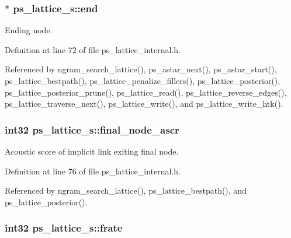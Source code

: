 \subsubsection[{end}]{$\ast$ ps\-\_\-lattice\-\_\-s\-::end}\label{structps__lattice__s_a00f30e2689853d6bcb31c8005a69dc7b}


Ending node. 



Definition at line 72 of file ps\-\_\-lattice\-\_\-internal.\-h.



Referenced by ngram\-\_\-search\-\_\-lattice(), ps\-\_\-astar\-\_\-next(), ps\-\_\-astar\-\_\-start(), ps\-\_\-lattice\-\_\-bestpath(), ps\-\_\-lattice\-\_\-penalize\-\_\-fillers(), ps\-\_\-lattice\-\_\-posterior(), ps\-\_\-lattice\-\_\-posterior\-\_\-prune(), ps\-\_\-lattice\-\_\-read(), ps\-\_\-lattice\-\_\-reverse\-\_\-edges(), ps\-\_\-lattice\-\_\-traverse\-\_\-next(), ps\-\_\-lattice\-\_\-write(), and ps\-\_\-lattice\-\_\-write\-\_\-htk().

\subsubsection[{final\-\_\-node\-\_\-ascr}]{\setlength{\rightskip}{0pt plus 5cm}int32 ps\-\_\-lattice\-\_\-s\-::final\-\_\-node\-\_\-ascr}\label{structps__lattice__s_aba113d4134c72d7405423c77bcc1247e}


Acoustic score of implicit link exiting final node. 



Definition at line 76 of file ps\-\_\-lattice\-\_\-internal.\-h.



Referenced by ngram\-\_\-search\-\_\-lattice(), ps\-\_\-lattice\-\_\-bestpath(), and ps\-\_\-lattice\-\_\-posterior().

\subsubsection[{frate}]{\setlength{\rightskip}{0pt plus 5cm}int32 ps\-\_\-lattice\-\_\-s\-::frate}\label{structps__lattice__s_a5159a2ff1e03a7c9782854bc67e56530}


